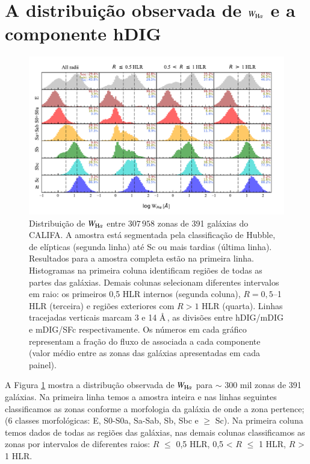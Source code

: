 \section{A distribuição observada de $W_{{\rm H}\alpha}$ e a componente hDIG}
\label{sec:DIGclass:WHaDistrib_hDIG}

\begin{figure}
\includegraphics[scale=0.9]{figuras/fig_WHa_histograms_per_morftype_and_radius_cumulFHa.pdf}
\caption[Histogramas de $W_{{\rm H}\alpha}$]
{Distribuição de $W_{\Ha}$ entre $307\,958$ zonas de 391 galáxias do CALIFA. A amostra está segmentada pela classificação de Hubble, de elípticas (segunda linha) até Sc ou mais tardias (última linha). Resultados para a amostra completa estão na primeira linha. Histogramas na primeira coluna identificam regiões de todas as partes das galáxias. Demais colunas selecionam diferentes intervalos em raio: os primeiros 0,5 HLR internos (segunda coluna), $R = 0,5$--1 HLR (terceira) e regiões exteriores com $R > 1$ HLR (quarta). Linhas tracejadas verticais marcam 3 e 14 \AA\,, as divisões entre hDIG/mDIG e mDIG/SFc respectivamente. Os números em cada gráfico representam a fração do fluxo de \Ha associada a cada componente (valor médio entre as zonas das galáxias apresentadas em cada painel).}
 \label{fig:WHaDistrib_ALLgals}
\end{figure}

A Figura \ref{fig:WHaDistrib_ALLgals} mostra a distribução observada de $W_{\Ha}$ para $\sim$ 300 mil zonas de 391 galáxias. Na primeira linha temos a amostra inteira e nas linhas seguintes classificamos as zonas conforme a morfologia da galáxia de onde a zona pertence; (6 classes morfológicas: E, S0-S0a, Sa-Sab, Sb, Sbc e $\ge$ Sc). Na primeira coluna temos dados de todas as regiões das galáxias, nas demais colunas classificamos as zonas por intervalos de diferentes raios: $R$ $\le$ 0,5 HLR, 0,5 < $R$ $\le$ 1 HLR, $R$ > 1 HLR.

